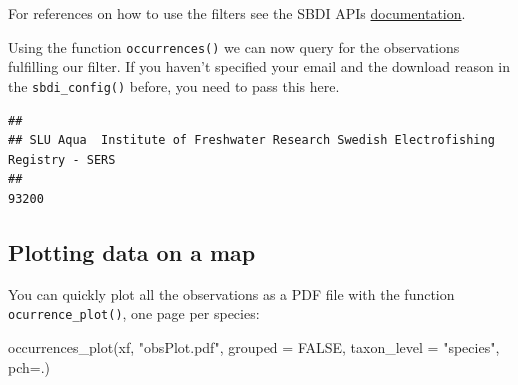 \documentclass[
  10pt,
]{article}
\newenvironment{Shaded}{\begin{snugshade}}{\end{snugshade}}
\newcommand{\AttributeTok}[1]{\textcolor[rgb]{0.77,0.63,0.00}{#1}}
\newcommand{\CommentTok}[1]{\textcolor[rgb]{0.56,0.35,0.01}{\textit{#1}}}
\newcommand{\ConstantTok}[1]{\textcolor[rgb]{0.00,0.00,0.00}{#1}}
\newcommand{\DecValTok}[1]{\textcolor[rgb]{0.00,0.00,0.81}{#1}}
\newcommand{\FunctionTok}[1]{\textcolor[rgb]{0.00,0.00,0.00}{#1}}
\newcommand{\NormalTok}[1]{#1}
\newcommand{\OtherTok}[1]{\textcolor[rgb]{0.56,0.35,0.01}{#1}}
\newcommand{\SpecialCharTok}[1]{\textcolor[rgb]{0.00,0.00,0.00}{#1}}
\newcommand{\StringTok}[1]{\textcolor[rgb]{0.31,0.60,0.02}{#1}}
\begin{document}
For references on how to use the filters see the SBDI APIs \href{https://api.biodiversitydata.se/?lang=en-US\#ws3}{documentation}.

Using the function \texttt{occurrences()} we can now query for the observations fulfilling our filter. If you haven't specified your email and the download reason in the \texttt{sbdi\_config()} before, you need to pass this here.

\begin{Shaded}
\end{Shaded}

\begin{verbatim}
## 
## SLU Aqua  Institute of Freshwater Research Swedish Electrofishing Registry - SERS 
##                                                                             93200
\end{verbatim}

\hypertarget{plotting-data-on-a-map}{%
\subsection{Plotting data on a map}\label{plotting-data-on-a-map}}

You can quickly plot all the observations as a PDF file with the function \texttt{ocurrence\_plot()}, one page per species:

\begin{Shaded}
\begin{Highlighting}[]
\FunctionTok{occurrences\_plot}\NormalTok{(xf, }\StringTok{"obsPlot.pdf"}\NormalTok{, }
                 \AttributeTok{grouped =} \ConstantTok{FALSE}\NormalTok{, }
                 \AttributeTok{taxon\_level =} \StringTok{"species"}\NormalTok{, }
                 \AttributeTok{pch=}\StringTok{\textquotesingle{}.\textquotesingle{}}\NormalTok{)}
\end{Highlighting}
\end{Shaded}
\end{document}
